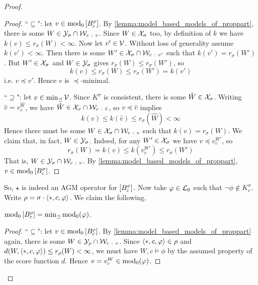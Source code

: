 \begin{proof}
\begin{proof}
            ``$\subseteq$": let $v \in \operatorname{mod}_0\left[{B^\sigma_c}\right]$. By
            \cref{lemma:model_based_models_of_proppart}, there is some $W \in
            \Y_\sigma \cap \W_{c\ :\  v}$. Since $W \in \mathcal{X}_\sigma$ too, by
            definition of $k$ we have $k(v) \le r_\sigma(W) < \infty$. Now let
            $v' \in \mathcal{V}$. Without loss of generality assume $k(v') < \infty$.
            Then there is some $W' \in \mathcal{X}_\sigma \cap \mathcal{W}_{c\ :\  v'}$ such that
            $k(v') = r_\sigma(W')$. But $W' \in \mathcal{X}_\sigma$ and $W \in
            \mathcal{Y}_\sigma$ gives $r_\sigma(W) \le r_\sigma(W')$, so
            \[
                k(v) \le r_\sigma(W) \le r_\sigma(W') = k(v')
            \]
            i.e. $v \preceq v'$. Hence $v$ is $\preceq$-minimal.

            ``$\supseteq$": let $v \in \min_{\preceq}\mathcal{V}$. Since $K^\sigma$
            is consistent, there is some $\hat{W} \in \mathcal{X}_\sigma$.  Writing
            $\hat{v} = v^{\hat{W}}_c$, we have $\hat{W} \in \mathcal{X}_\sigma \cap
            \mathcal{W}_{c\ :\ \hat{v}}$, so $v \preceq \hat{v}$ implies
            \[
                k(v)
                \le k(\hat{v})
                \le r_\sigma(\hat{W})
                < \infty
            \]
            Hence there must be some $W \in \X_\sigma \cap \W_{c\ :\ v}$ such
            that $k(v) = r_\sigma(W)$. We claim that, in fact, $W \in
            \mathcal{Y}_\sigma$. Indeed, for any $W' \in \mathcal{X}_\sigma$ we have $v \preceq
            v^{W'}_c$, so
            \[
                r_\sigma(W)
                = k(v)
                \le k(v^{W'}_c)
                \le r_\sigma(W')
            \]
            That is, $W \in \Y_\sigma \cap \W_{c\ :\  v}$. By
            \cref{lemma:model_based_models_of_proppart}, $v \in
            \operatorname{mod}_0\left[{B^\sigma_c}\right]$.

        \end{proof}

    So, $\star$ is indeed an AGM operator for $\left[{B^\sigma_c}\right]$. Now take
    $\varphi \in \mathcal{L}{}_0$ such that $\neg\phi \notin K^\sigma_c$. Write $\rho =
    \sigma \cdot \langle {\ast, c, \varphi} \rangle$. We claim the following.

        \begin{claim}
            \label{claim:propmods_rho_min_models_of_phi}
            $\operatorname{mod}_0\left[{B^\rho_c}\right] =
            \min\nolimits_{\preceq}{\operatorname{mod}_0(\varphi)}$.
        \end{claim}
        \begin{proof}
            ``$\subseteq$": let $v \in \operatorname{mod}_0\left[{B^\rho_c}\right]$.  By
            \cref{lemma:model_based_models_of_proppart} again, there is some $W
            \in \mathcal{Y}_\rho \cap \mathcal{W}_{c\ :\  v}$. Since $\langle {\ast, c, \varphi} \rangle \in
            \rho$ and $d(W, \langle {\ast, c, \varphi} \rangle) \le r_\rho(W) < \infty$, we
            must have $W, c \models \phi$ by the assumed property of the score
            function $d$. Hence $v = v^W_c \in \operatorname{mod}_0(\varphi)$.


\end{proof}
\end{proof}

